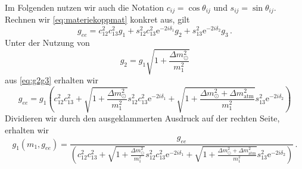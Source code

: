Im Folgenden nutzen wir auch die Notation $c_{ij} = \cos{\theta_{ij}}$ und $s_{ij} = \sin{\theta_{ij}}$.
Rechnen wir \eqref{eq:materiekoppmat} konkret aus, gilt
\begin{equation}
    g_{ee} = c^2_{1 2} c^2_{1 3} g_1 + s^2_{12} c^2_{13} \mathrm{e}^{-2 i \delta_1} g_2 + s^2_{13} \mathrm{e}^{-2 i \delta_2}  g_3 \,.
    \label{eq:g_ee}
\end{equation}
Unter der Nutzung von
\begin{equation*}
    g_2 = g_1 \sqrt{1 + \frac{\Delta m^2_\odot}{m^2_1}}
\end{equation*}
aus \eqref{eq:g2g3} erhalten wir
\begin{equation*}
    g_{ee} = g_1 \left(c^2_{1 2} c^2_{1 3} + \sqrt{1 + \frac{\Delta m^2_\odot}{m^2_1}}s^2_{12} c^2_{13} \mathrm{e}^{-2 i \delta_1} + \sqrt{1 + \frac{\Delta m^2_\odot + \Delta m^2_\text{atm}}{m^2_1}} s^2_{13} \mathrm{e}^{-2 i \delta_2}\right)
\end{equation*}
Dividieren wir durch den ausgeklammerten Ausdruck auf der rechten Seite, erhalten wir
\begin{equation}
    g_1(m_1,g_{ee}) = \frac{g_{ee}}{\left(c^2_{1 2} c^2_{1 3} + \sqrt{1 + \frac{\Delta m^2_\odot}{m^2_1}}s^2_{12} c^2_{13} \mathrm{e}^{-2 i \delta_1} + \sqrt{1 + \frac{\Delta m^2_\odot + \Delta m^2_\text{atm}}{m^2_1}} s^2_{13} \mathrm{e}^{-2 i \delta_2}\right)} \,.
    \label{eq:g_1g_ee}
\end{equation}

